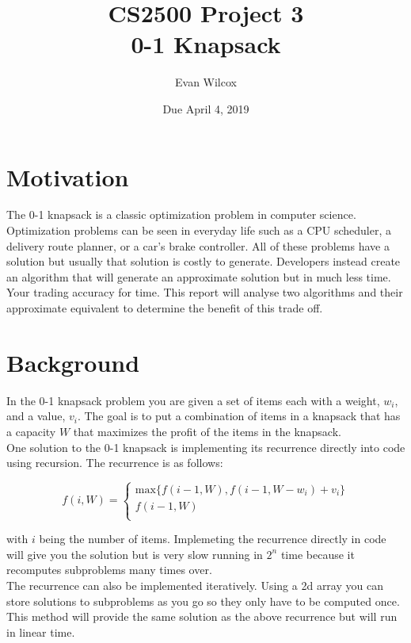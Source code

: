 \documentclass[a4paper]{article}
\title{CS2500 Project 3 \\ 0-1 Knapsack}
\author{Evan Wilcox}
\date{Due April 4, 2019}
\begin{document}
    \maketitle

    \section{Motivation}
    The 0-1 knapsack is a classic optimization problem in computer science. Optimization 
    problems can be seen in everyday life such as a CPU scheduler, a delivery route planner, 
    or a car's brake controller. All of these problems have a solution but usually that 
    solution is costly to generate. Developers instead create an algorithm that will generate
    an approximate solution but in much less time. Your trading accuracy for time. This report
    will analyse two algorithms and their approximate equivalent to determine the benefit of 
    this trade off.


    \section{Background}
    In the 0-1 knapsack problem you are given a set of items each with a weight, $w_{i}$,
    and a value, $v_{i}$. The goal is to put a combination of items in a knapsack 
    that has a capacity $W$ that maximizes the profit of the items in the knapsack. \\

    One solution to the 0-1 knapsack is implementing its recurrence directly into 
    code using recursion. The recurrence is as follows:
    
    \[ f(i, W)=\begin{cases} 
      \text{max}\{f(i-1, W), f(i-1, W-w_{i}) + v_{i}\}\\
      f(i-1, W) \\
    \end{cases}
    \]

    with $i$ being the number of items. Implemeting the recurrence directly in code
    will give you the solution but is very slow running in $2^{n}$ time because it 
    recomputes subproblems many times over. \\ 

    The recurrence can also be implemented iteratively. Using a 2d array you can store
    solutions to subproblems as you go so they only have to be computed once. This 
    method will provide the same solution as the above recurrence but will run in 
    linear time. \\
\end{document}
